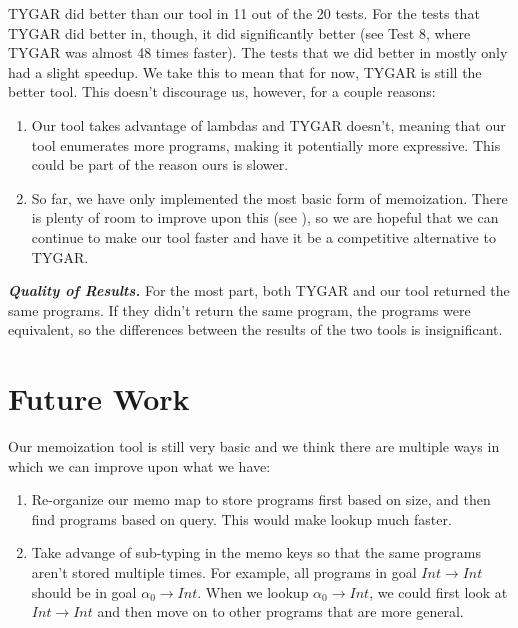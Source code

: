 \documentclass[acmsmall,nonacm]{acmart}
\begin{document}
TYGAR did better than our tool in 11 out of the 20 tests. 
For the tests that TYGAR did better in, though, it did significantly better 
(see Test 8, where TYGAR was almost 48 times faster). The tests that we did better
in mostly only had a slight speedup. We take this to mean that for now, TYGAR is
still the better tool. This doesn’t discourage us, however, for a couple reasons:
\begin{enumerate}
  \item Our tool takes advantage of lambdas and TYGAR doesn't, meaning that our 
  tool enumerates more programs, making it potentially more expressive. This could be 
  part of the reason ours is slower. 
  \item So far, we have only implemented the most basic form of memoization. There is plenty of 
  room to improve upon this (see ), so we are hopeful that we can 
  continue to make our tool faster and have it be a competitive alternative to 
  TYGAR. 

\end{enumerate}

\vspace{2mm}
\noindent \textbf{\textit{Quality of Results.}} For the most part, both TYGAR 
and our tool returned the same programs. If they didn't return the same program,
the programs were equivalent, so the differences between the results of the two
tools is insignificant. 

\section{Future Work}
\label{future}

Our memoization tool is still very basic and we think there are multiple ways in
which we can improve upon what we have:

\begin{enumerate}
  \item Re-organize our memo map to store programs first based on size, and then 
        find programs based on query. This would make lookup much faster.
  \item Take advange of sub-typing in the memo keys so that the same programs
        aren't stored multiple times. For example, all programs in goal 
        $Int \to Int$ should be in goal $\alpha_0 \to Int$. When
        we lookup $\alpha_0 \to Int$, we could first look at $Int \to Int$
        and then move on to other programs that are more general.
\end{enumerate}
\end{document}
